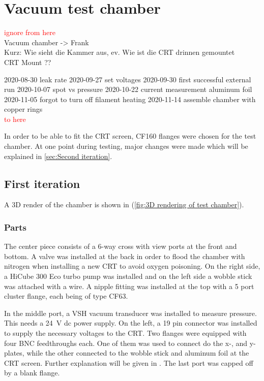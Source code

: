 
\chapter{Vacuum test chamber}
\label{ch:Vacuum chamber}

\textcolor{red}{ignore from here} \\
Vacuum chamber -> Frank \\
Kurz: Wie sieht die Kammer aus, ev. Wie ist die CRT drinnen gemountet \\
CRT Mount ??


2020-08-30 leak rate
2020-09-27 set voltages
2020-09-30 first successful external run
2020-10-07 spot vs pressure
2020-10-22 current measurement aluminum foil
2020-11-05 forgot to turn off filament heating
2020-11-14 assemble chamber with copper rings \\
\textcolor{red}{to here}

In order to be able to fit the CRT screen, CF160 flanges were chosen for the test chamber. At one point during testing, major changes were made which will be explained in \cref{sec:Second iteration}.

\section{First iteration}
\label{sec:vacuum chamber first iteration}

A 3D render of the chamber is shown in  (\cref{fig:3D rendering of test chamber}).
 
\subsection{Parts}
\label{subsec:Parts}
 
The center piece consists of a 6-way cross with view ports at the front and bottom. A valve was installed at the back in order to flood the chamber with nitrogen when installing a new CRT to avoid oxygen poisoning. On the right side, a HiCube 300 Eco turbo pump was installed and on the left side a wobble stick was attached with a wire. A nipple fitting  was installed at the top with a 5 port cluster flange, each being of type CF63.
 
In the middle port, a VSH vacuum transducer was installed to measure pressure. This needs a \SI{24}{\volt} dc power supply. On the left, a 19 pin connector  was installed to supply the necessary voltages to the CRT. Two flanges were equipped with four BNC feedthroughs each. One of them was used to connect do the x-, and y-plates, while the other connected to the wobble stick and aluminum foil at the CRT screen. Further explanation will be given in . The last port was capped off by a blank flange.
 

